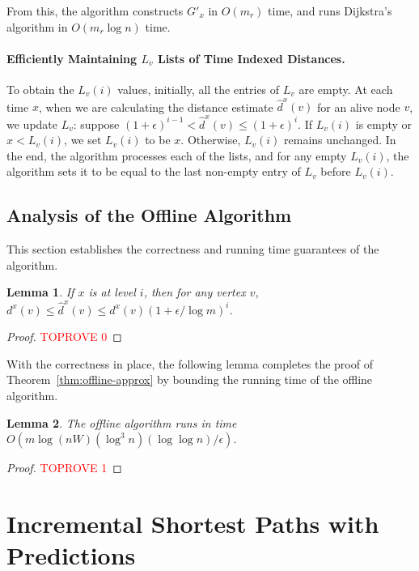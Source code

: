 \documentclass[11pt]{article}
\newtheorem{lemma}{Lemma}
\begin{document}
From this, the algorithm constructs $G'_x$ in $O(m_r)$ time, and runs Dijkstra's algorithm in $O(m_r\log n)$ time. 

\paragraph{Efficiently Maintaining $L_v$ Lists of Time Indexed Distances.}
To obtain the $L_v(i)$ values, initially, all the entries of $L_v$ are empty. 
At each time $x$, when we are calculating the distance estimate $\hat{d}^x(v)$ for an alive node $v$, we update $L_v$: suppose $(1+\epsilon)^{i-1} < \hat{d}^x(v) \leq (1+\epsilon)^{i}$.
If $L_v(i)$ is empty or $x<L_v(i)$, we set $L_v(i)$ to be $x$. Otherwise, $L_v(i)$ remains unchanged. In the end, the algorithm processes each of the lists, and for any empty $L_v(i)$, the algorithm sets it to be equal to the last non-empty entry of $L_v$ before $L_v(i)$.

\subsection{Analysis of the Offline Algorithm}
\label{sec:offline_analysis}

This section establishes the correctness and running time guarantees of the algorithm.   

\begin{lemma}
\label{lem:refined_approx}
   If $x$ is at level $i$, then for any vertex $v$, $d^x(v) \leq \hat{d}^x(v) \leq d^x(v)(1 + \epsilon/ \log m)^i$. 
\end{lemma}
\begin{proof}\textcolor{red}{TOPROVE 0}\end{proof}

With the correctness in place, the following lemma completes the proof of Theorem~\ref{thm:offline-approx} by bounding the running time of the offline algorithm. 

\begin{lemma}
\label{lem:offline-runtime}
    The offline algorithm runs in time $O(m\log (nW)  (\log^3 n) (\log \log n)/\epsilon)$.
\end{lemma}
\begin{proof}\textcolor{red}{TOPROVE 1}\end{proof} \section{Incremental Shortest Paths with Predictions}
\end{document}
